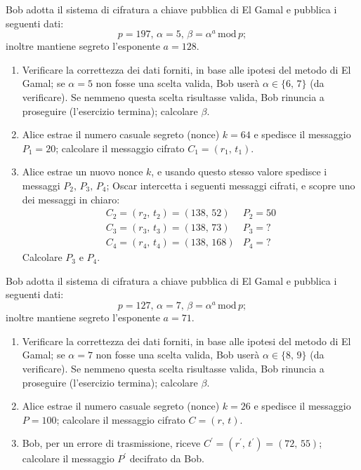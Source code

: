         Bob adotta il sistema di cifratura a chiave pubblica di El Gamal e pubblica i seguenti dati: \[
            p=197,\, \alpha=5,\, \beta= \alpha^{a} \,\mathrm{mod}\, p
        ;\] inoltre mantiene segreto l'esponente $a=128$.
        \begin{enumerate}
            \item Verificare la correttezza dei dati forniti, in base alle ipotesi del metodo di 
                El Gamal; se $\alpha=5$ non fosse una scelta valida, Bob userà $\alpha\in\{6,\,7\}$ 
                (da verificare). Se nemmeno questa scelta risultasse valida, Bob rinuncia a proseguire 
                (l'esercizio termina); calcolare $\beta$.
            \item Alice estrae il numero casuale segreto (nonce) $k=64$ e spedisce il messaggio $P_1=20$; 
                calcolare il messaggio cifrato $C_1=(r_1,\,t_1)$.
            \item Alice estrae un nuovo nonce $k$, e usando questo stesso valore spedisce i messaggi 
                $P_2,\,P_3,\,P_4$; Oscar intercetta i seguenti messaggi cifrati, e scopre uno dei messaggi 
                in chiaro: \[
                \begin{array}{ll}
                    C_2=(r_2,\,t_2)=(138,\,52) & P_2=50\\
                    C_3=(r_3,\,t_3)=(138,\,73) & P_3=?\\
                    C_4=(r_4,\,t_4)=(138,\,168) & P_4=?
                \end{array}
                \] Calcolare $P_3$ e $P_4$.
        \end{enumerate}

        Bob adotta il sistema di cifratura a chiave pubblica di El Gamal e pubblica i seguenti dati: \[
            p=127,\, \alpha=7,\, \beta= \alpha^{a} \,\mathrm{mod}\, p
        ;\] inoltre mantiene segreto l'esponente $a=71$.
        \begin{enumerate}
            \item Verificare la correttezza dei dati forniti, in base alle ipotesi del metodo di 
                El Gamal; se $\alpha=7$ non fosse una scelta valida, Bob userà $\alpha\in\{8,\,9\}$ 
                (da verificare). Se nemmeno questa scelta risultasse valida, Bob rinuncia a proseguire 
                (l'esercizio termina); calcolare $\beta$.
            \item Alice estrae il numero casuale segreto (nonce) $k=26$ e spedisce il messaggio $P=100$; 
                calcolare il messaggio cifrato $C=(r,\,t)$.
            \item Bob, per un errore di trasmissione, riceve $C^{\prime}=(r^{\prime},\,t^{\prime})=(72,\,55)$; 
                calcolare il messaggio $P^{\prime}$ decifrato da Bob.
        \end{enumerate}

